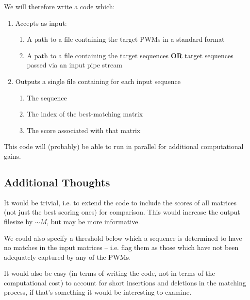 \documentclass[a4paper,9pt]{article}
\begin{document}
			We will therefore write a code which:
			\begin{enumerate}
				\item Accepts as input:
				\begin{enumerate}
					\item A path to a file containing the target PWMs in a standard format
					\item A path to a file containing the target sequences \textbf{OR} target sequences passed via an input pipe stream
				\end{enumerate}
				\item Outputs a single file containing for each input sequence
				\begin{enumerate}
					\item The sequence
					\item The index of the best-matching matrix
					\item The score associated with that matrix
				\end{enumerate}
			\end{enumerate}

			This code will (probably) be able to run in parallel for additional computational gains.
		\subsection{Additional Thoughts}
			It would be trivial, i.e. to extend the code to include the scores of all matrices (not just the best scoring ones) for comparison. This would increase the output filesize by $\sim M$, but may be more informative. 

			We could also specify a threshold below which a sequence is determined to have no matches in the input matrices -- i.e. flag them as those which have not been adequately captured by any of the PWMs.

			It would also be easy (in terms of writing the code, not in terms of the computational cost) to account for short insertions and deletions in the matching process, if that's something it would be interesting to examine.  
\end{document}
